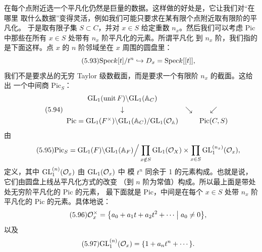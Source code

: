 在每个点附近选一个平凡化仍然是巨量的数据。这样做的好处是，它让我们对“在哪里
取什么数据”变得灵活，例如我们可能只要求在某有限个点附近取有限阶的平凡化。
于是取有限子集 $S\subset C$，并对 $x\in S$ 给定重数 $n_{x}$。然后我们可以考虑
$\mathrm{Pic}$ 中那些在所有 $x\in S$ 处带有 $n_{x}$ 阶平凡化的元素。所谓平凡化
到 $n_{x}$ 阶，我们指的是下面这样。点 $x$ 的 $n$ 阶邻域坐在 $x$ 周围的圆盘里：
\begin{equation}\tag{5.93}
\mathrm{Spec} k[t]/t^{n}\hookrightarrow D_{x}=\mathrm{Spec} k[[t]],
\end{equation}
我们不是要求丛的无穷 Taylor 级数截面，而是要求一个有限阶 $n_{x}$ 的截面。这给出
一个中间商 $\mathrm{Pic}_{S}$：
\begin{equation}\tag{5.94}
\begin{array}{ccc}
\mathrm{GL}_{1}(\text{unit}\,F)\backslash\mathrm{GL}_{1}(\mathbb{A}_{C}) & & \\[4pt]
\downarrow & \searrow & \swarrow\\[4pt]
\mathrm{Pic}=\mathrm{GL}_{1}(F^{\times})\backslash\mathrm{GL}_{1}(\mathbb{A}_{C})/\mathrm{GL}_{1}(\mathcal{O}_{\mathbb{A}}) & & \mathrm{Pic}(C,S)
\end{array}
\end{equation}
由
\begin{equation}\tag{5.95}
\mathrm{Pic}_{S}=\mathrm{GL}_{1}(F)\backslash\mathrm{GL}_{1}(\mathbb{A}_{F})\Big/
\prod_{x\notin S}\mathrm{GL}_{1}(\mathcal{O}_{X})\times\prod_{x\in S}\mathrm{GL}^{(n_{x})}_{1}(\mathcal{O}_{x}),
\end{equation}
定义，其中 $\mathrm{GL}^{(n)}_{1}(\mathcal{O}_{x})$ 由 $\mathrm{GL}_{1}(\mathcal{O}_{x})$ 中
模 $t^{n}$ 同余于 1 的元素构成。也就是说，它们由圆盘上线丛平凡化方式的改变
（到 $n$ 阶为常值）构成。所以最上面是带处处无穷阶平凡化的 $\mathrm{Pic}$ 的元素，
最下面就是 $\mathrm{Pic}$，中间是在每个 $x\in S$ 处带 $n_{x}$ 阶平凡化的
$\mathrm{Pic}$ 的元素。具体地说：
\begin{equation}\tag{5.96}
\mathcal{O}_{x}^{\times}=\bigl\{a_{0}+a_{1}t+a_{2}t^{2}+\cdots\bigm|a_{0}\neq0\bigr\},
\end{equation}
以及
\begin{equation}\tag{5.97}
\mathrm{GL}^{(n)}_{1}(\mathcal{O}_{x})=\{1+a_{n}t^{n}+\cdots\}.
\end{equation}

